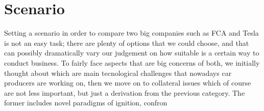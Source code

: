 \section{Scenario}

Setting a scenario in order to compare two big companies such as FCA and Tesla is not an easy task; there are plenty of options that we could choose, and that can possibly dramatically vary our judgement on how suitable is a certain way to conduct business. To fairly face aspects that are big concerns of both, we initially thought about which are main tecnological challenges that nowadays car producers are working on, then we move on to collateral issues which of course are not less important, but just a derivation from the previous category. The former includes novel paradigms of ignition, confron

